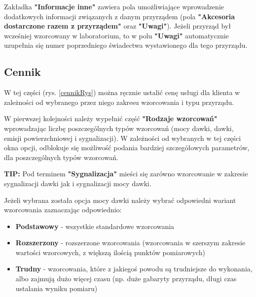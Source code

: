 Zakładka \textbf{"Informacje inne"} zawiera pola umożliwiające wprowadzenie dodatkowych informacji związanych z danym przyrządem (pola \textbf{"Akcesoria dostarczone razem z przyrządem"} oraz \textbf{"Uwagi"}). Jeżeli przyrząd był wcześniej wzorcowany w laboratorium, to w polu \textbf{"Uwagi"} automatycznie uzupełnia się numer poprzedniego świadectwa wystawionego dla tego przyrządu.

\subsection{Cennik}
\label{cennik}

W tej części (rys. \ref{cennikRys}) można ręcznie ustalić cenę usługi dla klienta w zależności od wybranego przez niego zakresu wzorcowania i typu przyrządu. 

W pierwszej kolejności należy wypełnić część \textbf{"Rodzaje wzorcowań"} wprowadzając liczbę poszczególnych typów wzorcowań (mocy dawki, dawki, emisji powierzchniowej i sygnalizacji). W zależności od wybranych w tej części okna opcji, odblokuje się możliwość podania bardziej szczegółowych parametrów, dla poszczególnych typów wzorcowań.

\textbf{TIP:} Pod terminem \textbf{"Sygnalizacja"} mieści się zarówno wzorcowanie w zakresie sygnalizacji dawki jak i sygnalizacji mocy dawki.

Jeżeli wybrana została opcja mocy dawki należy wybrać odpowiedni wariant wzorcowania zaznaczając odpowiednio:
\begin{itemize}
	\item \textbf{Podstawowy} - wszystkie standardowe wzorcowania
	\item \textbf{Rozszerzony} - rozszerzone wzorcowania (wzorcowania w szerszym zakresie wartości wzorcowych, z większą ilością punktów pomiarowych)
	\item \textbf{Trudny} - wzorcowania, które z jakiegoś powodu są trudniejsze do wykonania, albo zajmują dużo więcej czasu (np. duże gabaryty przyrządu, długi czas ustalania wyniku pomiaru)
\end{itemize}

